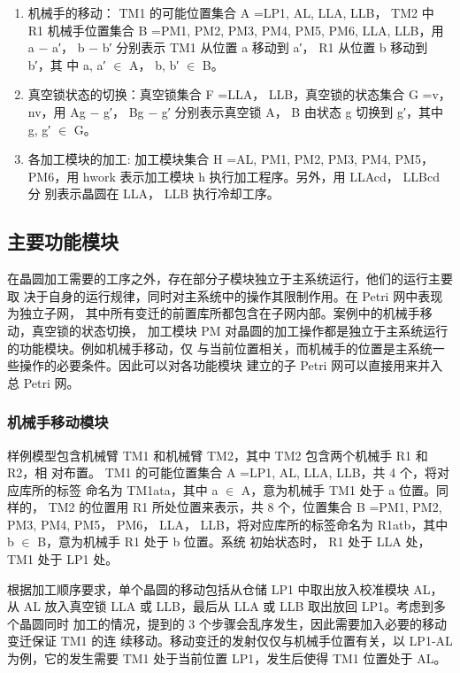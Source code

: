 \begin{enumerate}
\begin{enumerate}
{		            BS1, BS2}，用 dpickc， ddropc 分别表示机械手 d 将晶圆从位置 c 拿起或放入
		            位置 c。
		      \item 机械手的移动： TM1 的可能位置集合 A ={LP1, AL, LLA, LLB}， TM2 中 R1
		            机械手位置集合 B ={PM1, PM2, PM3, PM4, PM5, PM6, LLA, LLB}，用
		            a − a′， b − b′ 分别表示 TM1 从位置 a 移动到 a′， R1 从位置 b 移动到 b′，其
		            中 a, a′ $\in$ A， b, b′ $\in$ B。
		      \item 真空锁状态的切换：真空锁集合 F ={LLA， LLB}，真空锁的状态集合 G ={v，
		            nv}，用 Ag − g′， Bg − g′ 分别表示真空锁 A， B 由状态 g 切换到 g′，其中
		            g, g′ $\in$ G。
		      \item 各加工模块的加工: 加工模块集合 H ={AL, PM1, PM2, PM3, PM4, PM5，
		            PM6}，用 hwork 表示加工模块 h 执行加工程序。另外，用 LLAcd， LLBcd 分
		            别表示晶圆在 LLA， LLB 执行冷却工序。
	      \end{enumerate}
\end{enumerate}
\subsection{主要功能模块}
在晶圆加工需要的工序之外，存在部分子模块独立于主系统运行，他们的运行主要取
决于自身的运行规律，同时对主系统中的操作其限制作用。在 Petri 网中表现为独立子网，
其中所有变迁的前置库所都包含在子网内部。案例中的机械手移动，真空锁的状态切换，
加工模块 PM 对晶圆的加工操作都是独立于主系统运行的功能模块。例如机械手移动，仅
与当前位置相关，而机械手的位置是主系统一些操作的必要条件。因此可以对各功能模块
建立的子 Petri 网可以直接用来并入总 Petri 网。
\subsubsection{机械手移动模块}
样例模型包含机械臂 TM1 和机械臂 TM2，其中 TM2 包含两个机械手 R1 和 R2，相
对布置。 TM1 的可能位置集合 A ={LP1, AL, LLA, LLB}，共 4 个，将对应库所的标签
命名为 TM1ata，其中 a $\in$ A，意为机械手 TM1 处于 a 位置。同样的， TM2 的位置用
R1 所处位置来表示，共 8 个，位置集合 B ={PM1, PM2, PM3, PM4, PM5， PM6， LLA，
LLB}，将对应库所的标签命名为 R1atb，其中 b $\in$ B，意为机械手 R1 处于 b 位置。系统
初始状态时， R1 处于 LLA 处， TM1 处于 LP1 处。

根据加工顺序要求，单个晶圆的移动包括从仓储 LP1 中取出放入校准模块 AL，从
AL 放入真空锁 LLA 或 LLB，最后从 LLA 或 LLB 取出放回 LP1。考虑到多个晶圆同时
加工的情况，提到的 3 个步骤会乱序发生，因此需要加入必要的移动变迁保证 TM1 的连
续移动。移动变迁的发射仅仅与机械手位置有关，以 LP1-AL 为例，它的发生需要 TM1
处于当前位置 LP1，发生后使得 TM1 位置处于 AL。

